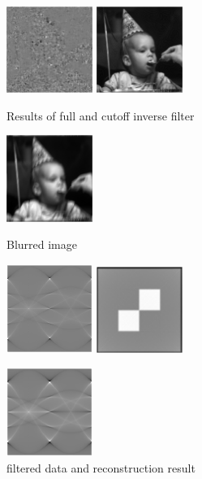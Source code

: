 \documentclass[11pt,letterpaper]{article}
\begin{document}
\begin{figure}
	\centering
	\includegraphics[width=0.25\textwidth]{images/p2a/full_res.png}
	\includegraphics[width=0.25\textwidth]{images/p2a/cutoff_res.png}
	\caption{Results of full and cutoff inverse filter}
	\label{fig:full_cutoff}
	\includegraphics[width=0.25\textwidth]{images/p2b/blur_res.png}
	\caption{Blurred image}
	\label{fig:blur_res}
	\includegraphics[width=0.25\textwidth]{images/p2c/filtered_data.png}
	\includegraphics[width=0.25\textwidth]{images/p2c/restored_res.png}
	\caption{filtered data and reconstruction result}
	\label{fig:p2c}
	\includegraphics[width=0.25\textwidth]{images/p2d/han_data.png}

\end{figure}
\end{document}
